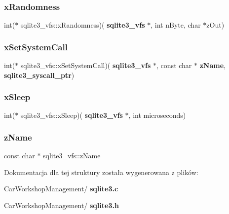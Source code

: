 \mbox{\label{structsqlite3__vfs_ace3fcb41cb01a947457532f645ba4c88}} 
\subsubsection{xRandomness}
{\footnotesize\ttfamily int($\ast$ sqlite3\+\_\+vfs\+::x\+Randomness)(\textbf{ sqlite3\+\_\+vfs} $\ast$, int n\+Byte, char $\ast$z\+Out)}

\mbox{\label{structsqlite3__vfs_a69996d40229d6eabe6869bb3fc80b730}} 
\subsubsection{xSetSystemCall}
{\footnotesize\ttfamily int($\ast$ sqlite3\+\_\+vfs\+::x\+Set\+System\+Call)(\textbf{ sqlite3\+\_\+vfs} $\ast$, const char $\ast$\textbf{ z\+Name}, \textbf{ sqlite3\+\_\+syscall\+\_\+ptr})}

\mbox{\label{structsqlite3__vfs_a8ebcfaceced9713024cb8e2508fe6c1b}} 
\subsubsection{xSleep}
{\footnotesize\ttfamily int($\ast$ sqlite3\+\_\+vfs\+::x\+Sleep)(\textbf{ sqlite3\+\_\+vfs} $\ast$, int microseconds)}

\mbox{\label{structsqlite3__vfs_a01a82d3e1a7efc00a762a00751ed592b}} 
\subsubsection{zName}
{\footnotesize\ttfamily const char $\ast$ sqlite3\+\_\+vfs\+::z\+Name}



Dokumentacja dla tej struktury została wygenerowana z plików\+:\begin{DoxyCompactItemize}
\item 
Car\+Workshop\+Management/\textbf{ sqlite3.\+c}\item 
Car\+Workshop\+Management/\textbf{ sqlite3.\+h}\end{DoxyCompactItemize}
